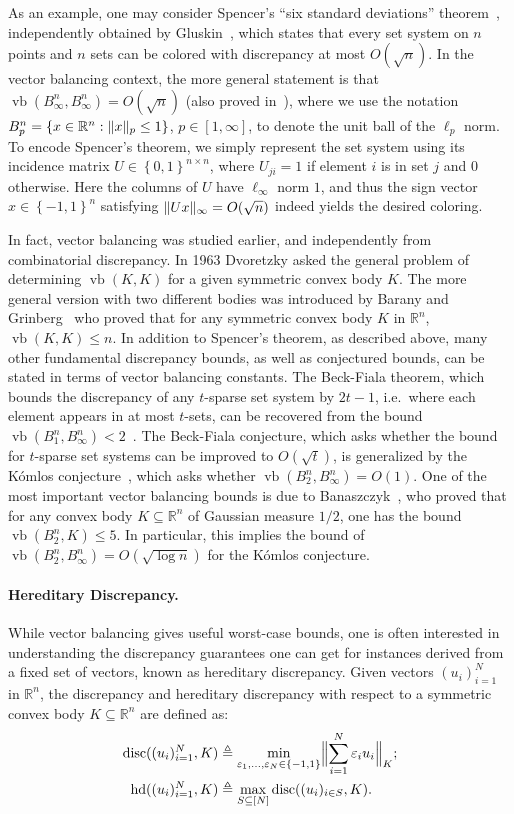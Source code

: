 \documentclass[11pt]{article}
\newcommand{\R}{{\mathbb{R}}}
\newcommand\eps{\varepsilon}
\newcommand{\eqdef}{\triangleq}
\newcommand{\set}[1]{\left\{ #1 \right\}}
\DeclareMathOperator{\disc}{disc}
\DeclareMathOperator{\hd}{hd}
\DeclareMathOperator{\vb}{vb}
\DeclarePairedDelimiter\norm{\lVert}{\rVert}
\begin{document}
As an example, one may consider Spencer's ``six standard deviations'' theorem~\cite{Spencer}, independently
obtained by Gluskin~\cite{gluskin}, which states that every set system on $n$
points and $n$ sets can be colored with discrepancy at most $O(\sqrt{n})$. In
the vector balancing context, the more general statement is that
$\vb(B_\infty^n,B_\infty^n) = O(\sqrt{n})$ (also proved
in~\cite{Spencer,gluskin}), where we use the notation $B_p^n = \set{x \in \R^n:
\norm{x}_p \leq 1}$, $p \in [1,\infty]$, to denote the unit ball of the $\ell_p$
norm. To encode Spencer's theorem, we simply represent the set system using its
incidence matrix $U \in \set{0,1}^{n \times n}$, where $U_{ji} = 1$ if element
$i$ is in set $j$ and $0$ otherwise. Here the columns of $U$ have $\ell_\infty$
norm $1$, and thus the sign vector $x \in \set{-1,1}^n$ satisfying $\norm{U
x}_\infty = O(\sqrt{n})$ indeed yields the desired coloring.   

In fact, vector balancing was studied earlier, and independently from
combinatorial discrepancy. In 1963 Dvoretzky asked the general problem
of determining $\vb(K, K)$ for a given symmetric convex body $K$. The
more general version with two different bodies was introduced by
Barany and Grinberg~\cite{baranygrinberg} who proved that for any
symmetric convex body $K$ in $\R^n$, $\vb(K, K) \le n$.  In addition
to Spencer's theorem, as described above, many other fundamental
discrepancy bounds, as well as conjectured bounds, can be stated in
terms of vector balancing constants. The Beck-Fiala theorem, which
bounds the discrepancy of any $t$-sparse set system by $2t-1$,
i.e.~where each element appears in at most $t$-sets, can be recovered
from the bound $\vb(B_1^n,B_\infty^n) < 2$~\cite{beckfiala}. The
Beck-Fiala conjecture, which asks whether the bound for $t$-sparse set
systems can be improved to $O(\sqrt{t})$, is generalized by the
K{\'o}mlos conjecture~\cite{spencer-lectures}, which asks whether
$\vb(B_2^n,B_\infty^n) = O(1)$. One of the most important vector
balancing bounds is due to Banaszczyk~\cite{bana}, who proved that for
any convex body $K \subseteq \R^n$ of Gaussian measure $1/2$, one has
the bound $\vb(B_2^n,K) \leq 5$. In particular, this implies the bound
of $\vb(B_2^n,B_\infty^n) = O(\sqrt{\log n})$ for the K{\'o}mlos
conjecture.



\paragraph{\bf Hereditary Discrepancy.} While vector balancing gives useful
worst-case bounds, one is often interested in understanding the discrepancy
guarantees one can get for instances derived from a fixed set of vectors, known
as hereditary discrepancy. Given vectors $(u_i)_{i=1}^N$ in $\R^n$, the
discrepancy and hereditary discrepancy with respect to a symmetric convex body
$K \subseteq \R^n$ are defined as:
\begin{align*}
\disc((u_i)_{i = 1}^N,K) &\eqdef \min_{\eps_1, \ldots,\eps_N \in
  \{-1, 1\}}
\Bigl\|\sum_{i = 1}^N{\eps_i u_i}\Bigr\|_{K};\\
\hd((u_i)_{i = 1}^N, K) &\eqdef \max_{S \subseteq [N]}{\disc((u_i)_{i \in S}, K)}.
\end{align*}
\end{document}

